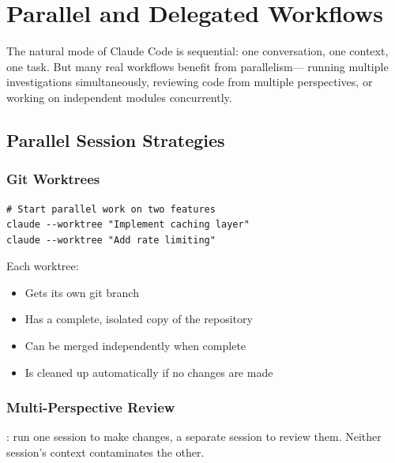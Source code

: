 \chapter{Parallel and Delegated Workflows}
\label{ch:parallel}

The natural mode of Claude Code is sequential: one conversation,
one context, one task. But many real workflows benefit from parallelism---
running multiple investigations simultaneously, reviewing code from
multiple perspectives, or working on independent modules concurrently.

\section{Parallel Session Strategies}
\label{sec:parallel-strategies}


\subsection{Git Worktrees}


\begin{verbatim}
# Start parallel work on two features
claude --worktree "Implement caching layer"
claude --worktree "Add rate limiting"
\end{verbatim}

Each worktree:
\begin{itemize}
  \item Gets its own git branch
  \item Has a complete, isolated copy of the repository
  \item Can be merged independently when complete
  \item Is cleaned up automatically if no changes are made
\end{itemize}

\subsection{Multi-Perspective Review}

: run one session to make changes,
a separate session to review them. Neither session's context contaminates the other.

